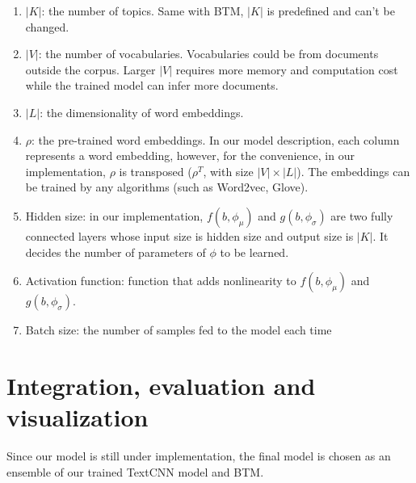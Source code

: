 \begin{enumerate}
    \item $|K|$: the number of topics. Same with BTM, $|K|$ is predefined and can't be changed.
    \item $|V|$: the number of vocabularies. Vocabularies could be from documents outside the corpus. Larger $|V|$ requires more memory and computation cost while the trained model can infer more documents.
    \item $|L|$: the dimensionality of word embeddings. 
    \item $\rho$: the pre-trained word embeddings. In our model description, each column represents a word embedding, however, for the convenience, in our implementation, $\rho$ is transposed ($\rho^T$, with size $|V|\times|L|$). The embeddings can be trained by any algorithms (such as Word2vec, Glove). 
    \item Hidden size: in our implementation, $f(b,\phi_\mu)$ and $g(b,\phi_\sigma)$ are two fully connected layers whose input size is hidden size and output size is $|K|$. It decides the number of parameters of $\phi$ to be learned.
    \item Activation function: function that adds nonlinearity to $f(b,\phi_\mu)$ and $g(b,\phi_\sigma)$.
    \item Batch size: the number of samples fed to the model each time
\end{enumerate}


\section{Integration, evaluation and visualization}
Since our model is still under implementation, the final model is chosen as an ensemble of our trained TextCNN model and BTM.